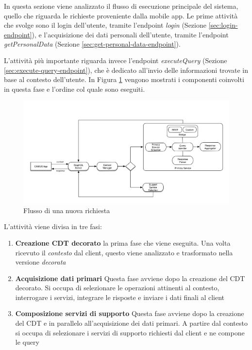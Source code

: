 In questa sezione viene analizzato il flusso di esecuzione principale del sistema, quello che riguarda le richieste proveniente dalla mobile app. Le prime attività che svolge sono il login dell'utente, tramite l'endpoint \emph{login} (Sezione \ref{sec:login-endpoint}), e l'acquisizione dei dati personali dell'utente, tramite l'endpoint \emph{getPersonalData} (Sezione \ref{sec:get-personal-data-endpoint}).

L'attività più importante riguarda invece l'endpoint \emph{executeQuery} (Sezione \ref{sec:execute-query-endpoint}), che è dedicato all'invio delle informazioni trovate in base al contesto dell'utente. In Figura \ref{fig:flusso-nuova-richiesta} vengono mostrati i componenti coinvolti in questa fase e l'ordine col quale sono eseguiti.

\begin{figure}[ht]
	\centering
	\includegraphics[width=\textwidth]{5-implementazione-backend/Immagini/flusso_richiesta.png}
	\caption{Flusso di una nuova richiesta\label{fig:flusso-nuova-richiesta}}
\end{figure}

L'attività viene divisa in tre fasi:

\begin{enumerate}
	\item \textbf{Creazione CDT decorato} \upe la prima fase che viene eseguita. Una volta ricevuto il \emph{contesto} dal client, questo viene analizzato e trasformato nella versione \emph{decorata}
	\item \textbf{Acquisizione dati primari} Questa fase avviene dopo la creazione del CDT decorato. Si occupa di selezionare le operazioni attinenti al contesto, interrogare i servizi, integrare le risposte e inviare i dati finali al client
	\item \textbf{Composizione servizi di supporto} Questa fase avviene dopo la creazione del CDT e in parallelo all'acquisizione dei dati primari. A partire dal contesto si occupa di selezionare i servizi di supporto richiesti dal client e ne compone le query
\end{enumerate}

